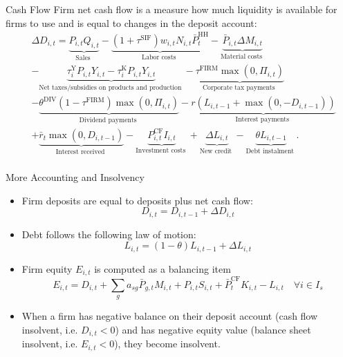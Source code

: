 \documentclass[9pt]{beamer}
\begin{document}
\begin{frame}{Cash Flow}
    Firm net cash flow is a measure how much liquidity is available for firms to use and is equal to changes in the deposit account:
\begin{equation}
\begin{aligned}
& \Delta D_{i,t}=\underbrace{P_{i,t} Q_{i,t}}_{\text {Sales }}-\underbrace{\left(1+\tau^{\mathrm{SIF}}\right) w_{i,t} N_{i,t} \bar{P}_t^{\mathrm{HH}}}_{\text {Labor costs }}-\underbrace{\bar{P}_{i,t} \Delta M_{i,t}}_{\text {Material costs }} \\
& -\underbrace{\tau_i^{\mathrm{Y}} P_{i,t} Y_{i,t}-\tau_i^{\mathrm{K}} P_{i,t} Y_{i,t}}_{\text {Net taxes/subsidies on products and production }}-\underbrace{\tau^{\mathrm{FIRM}} \max \left(0, \Pi_{i,t}\right)}_{\text {Corporate tax payments }} \\
& -\underbrace{\theta^{\mathrm{DIV}}\left(1-\tau^{\mathrm{FIRM}}\right) \max \left(0, \Pi_{i,t}\right)}_{\text {Dividend payments }}-\underbrace{r\left(L_{i,t-1}+\max \left(0,-D_{i,t-1}\right)\right)}_{\text {Interest payments }} \\
& +\underbrace{\bar{r}_t \max \left(0, D_{i,t-1}\right)}_{\text {Interest received }}-\underbrace{P_{i,t}^{\mathrm{CF}} I_{i,t}}_{\text {Investment costs }}+\underbrace{\Delta L_{i,t}}_{\text {New credit }}-\underbrace{\theta L_{i,t-1}}_{\text {Debt instalment }} . \\
&
\end{aligned}
\end{equation}
    \hyperlink{ReturnOverview}{}

\end{frame}
\begin{frame}{More Accounting and Insolvency}
\begin{itemize}
    \item Firm deposits are equal to deposits plus net cash flow:
\begin{equation}
    D_{i,t}=D_{i,t-1}+\Delta D_{i,t}
\end{equation}
\item Debt follows the following law of motion:
\begin{equation}
    L_{i,t}=(1-\theta) L_{i,t-1}+\Delta L_{i,t}
\end{equation}
\item Firm equity $E_{i,t}$ is computed as a balancing item 
\begin{equation}
    E_{i,t}=D_{i,t}+\sum_g a_{s g} \bar{P}_{g,t} M_{i,t}+P_{i,t} S_{i,t}+\bar{P}^{\mathrm{CF}}_t  K_{i,t}-L_{i,t} \quad \forall i \in I_s
\end{equation}
\item When a firm has negative balance on their deposit account (cash flow insolvent, i.e. $D_{i,t}<0$) and has negative equity value (balance sheet insolvent, i.e. $E_{i,t}<0$), they become insolvent.
\end{itemize}
    \hyperlink{ReturnOverview}{}
\end{frame}
\end{document}
